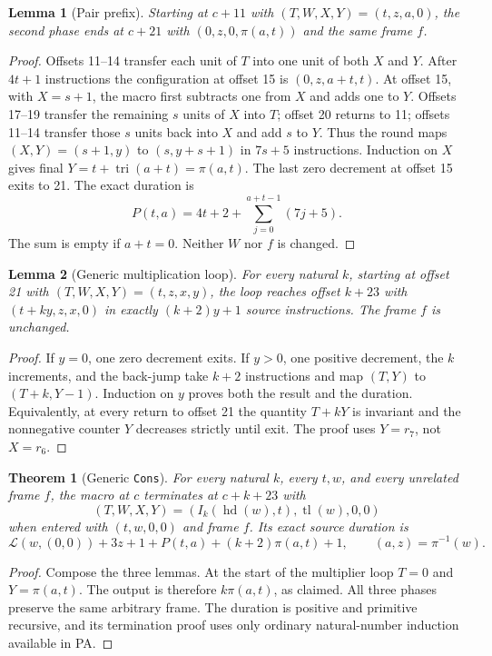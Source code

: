 \documentclass[11pt]{article}
\newtheorem{lemma}{Lemma}
\newtheorem{theorem}{Theorem}
\newcommand{\pair}[2]{\pi(#1,#2)}
\newcommand{\tri}{\operatorname{tri}}
\begin{document}
\begin{lemma}[Pair prefix]
Starting at $c+11$ with $(T,W,X,Y)=(t,z,a,0)$, the second phase ends at
$c+21$ with $(0,z,0,\pair at)$ and the same frame $f$.
\end{lemma}
\begin{proof}
Offsets 11--14 transfer each unit of $T$ into one unit of both $X$ and $Y$.
After $4t+1$ instructions the configuration at offset 15 is
$(0,z,a+t,t)$.  At offset 15, with $X=s+1$, the macro first subtracts
one from $X$ and adds one to $Y$.  Offsets 17--19 transfer the remaining
$s$ units of $X$ into $T$; offset 20 returns to 11; offsets 11--14
transfer those $s$ units back into $X$ and add $s$ to $Y$.
Thus the round maps $(X,Y)=(s+1,y)$ to $(s,y+s+1)$ in $7s+5$
instructions.  Induction on $X$ gives final $Y=t+\tri(a+t)=\pair at$.
The last zero decrement at offset 15 exits to 21.  The exact duration is
\[
 P(t,a)=4t+2+\sum_{j=0}^{a+t-1}(7j+5).
\]
The sum is empty if $a+t=0$.  Neither $W$ nor $f$ is changed.
\end{proof}

\begin{lemma}[Generic multiplication loop]
For every natural $k$, starting at offset 21 with
$(T,W,X,Y)=(t,z,x,y)$, the loop reaches offset $k+23$ with
$(t+ky,z,x,0)$ in exactly $(k+2)y+1$ source instructions.  The frame $f$
is unchanged.
\end{lemma}
\begin{proof}
If $y=0$, one zero decrement exits.  If $y>0$, one positive decrement,
the $k$ increments, and the back-jump take $k+2$ instructions and map
$(T,Y)$ to $(T+k,Y-1)$.  Induction on $y$ proves both the result and the
duration.  Equivalently, at every return to offset 21 the quantity
$T+kY$ is invariant and the nonnegative counter $Y$ decreases strictly
until exit.  The proof uses $Y=r_7$, not $X=r_6$.
\end{proof}

\begin{theorem}[Generic \texttt{Cons}]
For every natural $k$, every $t,w$, and every unrelated frame $f$, the
macro at $c$ terminates at $c+k+23$ with
\[
 (T,W,X,Y)=(I_k(\operatorname{hd}(w),t),\operatorname{tl}(w),0,0)
\]
when entered with $(t,w,0,0)$ and frame $f$.  Its exact source duration is
\[
 \mathcal{L}(w,(0,0))+3z+1+P(t,a)+(k+2)\pair at+1,
 \qquad (a,z)=\pi^{-1}(w).
\]
\end{theorem}
\begin{proof}
Compose the three lemmas.  At the start of the multiplier loop $T=0$
and $Y=\pair at$.  The output is therefore $k\pair at$, as claimed.
All three phases preserve the same arbitrary frame.  The duration is
positive and primitive recursive, and its termination proof uses only
ordinary natural-number induction available in PA.
\end{proof}
\end{document}
